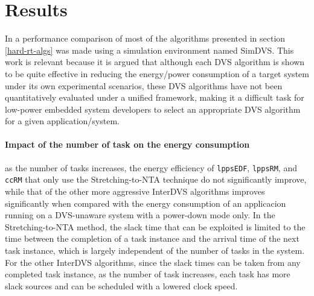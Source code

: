 \documentclass[10pt,article]{IEEEtran}
\begin{document}
\section{Results}
In \cite{kim-2} a performance comparison of most of the algorithms presented in section \ref{hard-rt-algs} was made using a simulation environment named SimDVS. This work is relevant because it is argued that although each DVS algorithm is shown to be quite effective in reducing the energy/power consumption of a target system under its own experimental scenarios, these DVS algorithms have not been quantitatively evaluated under a unified framework, making it a difficult task for low-power embedded system developers to select an appropriate DVS algorithm for a given application/system.




\paragraph{Impact of the number of task on the energy consumption} as the number of tasks increases,  the  energy  efficiency  of \texttt{lppsEDF}, \texttt{lppsRM}, and \texttt{ccRM} that only use the Stretching-to-NTA technique do not significantly improve, while that of the other more aggressive InterDVS algorithms improves significantly when compared with the energy consumption of an applicacion running on a DVS-unaware system with a power-down mode only. In the Stretching-to-NTA method, the slack time that can be exploited is limited to the time between the completion of a task instance and the arrival time of the next task instance, which is largely independent of the number of tasks in the system. For the other InterDVS algorithms, since the slack times can be taken from any completed task instance, as the number of task increases, each task has more slack sources and can be scheduled with a lowered clock speed.
\end{document}
